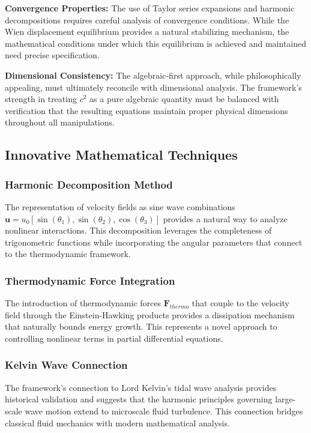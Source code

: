 ﻿\documentclass[12pt]{article}
\begin{document}
\textbf{Convergence Properties:} The use of Taylor series expansions and harmonic decompositions requires careful analysis of convergence conditions. While the Wien displacement equilibrium provides a natural stabilizing mechanism, the mathematical conditions under which this equilibrium is achieved and maintained need precise specification.

\textbf{Dimensional Consistency:} The algebraic-first approach, while philosophically appealing, must ultimately reconcile with dimensional analysis. The framework's strength in treating $c^2$ as a pure algebraic quantity must be balanced with verification that the resulting equations maintain proper physical dimensions throughout all manipulations.

\subsection{Innovative Mathematical Techniques}
\subsubsection{Harmonic Decomposition Method}
The representation of velocity fields as sine wave combinations $\mathbf{u} = u_0[\sin(\theta_1), \sin(\theta_2), \cos(\theta_3)]$ provides a natural way to analyze nonlinear interactions. This decomposition leverages the completeness of trigonometric functions while incorporating the angular parameters that connect to the thermodynamic framework.

\subsubsection{Thermodynamic Force Integration}
The introduction of thermodynamic forces $\mathbf{F}_{thermo}$ that couple to the velocity field through the Einstein-Hawking products provides a dissipation mechanism that naturally bounds energy growth. This represents a novel approach to controlling nonlinear terms in partial differential equations.

\subsubsection{Kelvin Wave Connection}
The framework's connection to Lord Kelvin's tidal wave analysis provides historical validation and suggests that the harmonic principles governing large-scale wave motion extend to microscale fluid turbulence. This connection bridges classical fluid mechanics with modern mathematical analysis.
\end{document}
